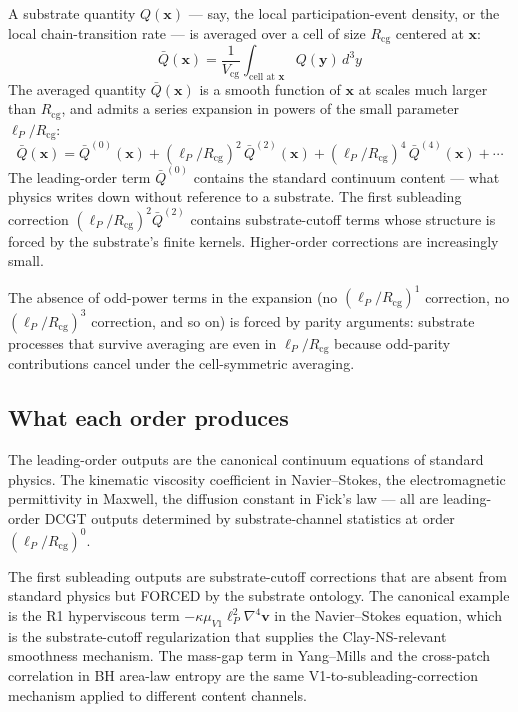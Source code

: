 \documentclass[11pt,a4paper]{article}
\begin{document}
A substrate quantity $Q(\mathbf{x})$ --- say, the local participation-event density, or the local chain-transition rate --- is averaged over a cell of size $R_{\mathrm{cg}}$ centered at $\mathbf{x}$:
\[
\bar Q(\mathbf{x}) = \frac{1}{V_{\mathrm{cg}}} \int_{\text{cell at }\mathbf{x}} Q(\mathbf{y})\, d^{3}y
\]
The averaged quantity $\bar Q(\mathbf{x})$ is a smooth function of $\mathbf{x}$ at scales much larger than $R_{\mathrm{cg}}$, and admits a series expansion in powers of the small parameter $\ell_P/R_{\mathrm{cg}}$:
\[
\bar Q(\mathbf{x}) = \bar Q^{(0)}(\mathbf{x}) + (\ell_P/R_{\mathrm{cg}})^{2}\, \bar Q^{(2)}(\mathbf{x}) + (\ell_P/R_{\mathrm{cg}})^{4}\, \bar Q^{(4)}(\mathbf{x}) + \cdots
\]
The leading-order term $\bar Q^{(0)}$ contains the standard continuum content --- what physics writes down without reference to a substrate. The first subleading correction $(\ell_P/R_{\mathrm{cg}})^2 \bar Q^{(2)}$ contains substrate-cutoff terms whose structure is forced by the substrate's finite kernels. Higher-order corrections are increasingly small.

The absence of odd-power terms in the expansion (no $(\ell_P/R_{\mathrm{cg}})^1$ correction, no $(\ell_P/R_{\mathrm{cg}})^3$ correction, and so on) is forced by parity arguments: substrate processes that survive averaging are even in $\ell_P/R_{\mathrm{cg}}$ because odd-parity contributions cancel under the cell-symmetric averaging.

\subsection{What each order produces}

The leading-order outputs are the canonical continuum equations of standard physics. The kinematic viscosity coefficient in Navier--Stokes, the electromagnetic permittivity in Maxwell, the diffusion constant in Fick's law --- all are leading-order DCGT outputs determined by substrate-channel statistics at order $(\ell_P/R_{\mathrm{cg}})^0$.

The first subleading outputs are substrate-cutoff corrections that are absent from standard physics but FORCED by the substrate ontology. The canonical example is the R1 hyperviscous term $-\kappa \mu_{V1} \ell_P^2 \nabla^4 \mathbf{v}$ in the Navier--Stokes equation, which is the substrate-cutoff regularization that supplies the Clay-NS-relevant smoothness mechanism. The mass-gap term in Yang--Mills and the cross-patch correlation in BH area-law entropy are the same V1-to-subleading-correction mechanism applied to different content channels.
\end{document}
